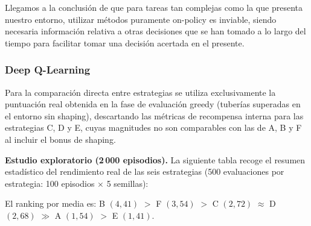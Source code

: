 Llegamos a la conclusión de que para tareas tan complejas como la que presenta nuestro entorno, utilizar métodos puramente on-policy es inviable, siendo necesaria información relativa a otras decisiones que se han tomado a lo largo del tiempo para facilitar tomar una decisión acertada en el presente.

\subsubsection*{Deep Q-Learning}

Para la comparación directa entre estrategias se utiliza exclusivamente la puntuación real obtenida en la fase de evaluación greedy (tuberías superadas en el entorno sin shaping), descartando las métricas de recompensa interna para las estrategias C, D y E, cuyas magnitudes no son comparables con las de A, B y F al incluir el bonus de shaping.

\textbf{Estudio exploratorio (2\,000 episodios).}
La siguiente tabla recoge el resumen estadístico del rendimiento real de las seis estrategias (500 evaluaciones por estrategia: 100 episodios $\times$ 5 semillas):
\begin{table}[h] %
\centering
\caption{Rendimiento determinista final en el estudio exploratorio (100 episodios por semilla,
entorno sin shaping). Ordenado por media de tuberías superadas.}
\label{tab:dqn_exploratorio}
\end{table}

El ranking por media es: B $(4{,}41)$ $>$ F $(3{,}54)$ $>$ C $(2{,}72)$ $\approx$ D $(2{,}68)$ $\gg$ A $(1{,}54)$ $>$ E $(1{,}41)$.

